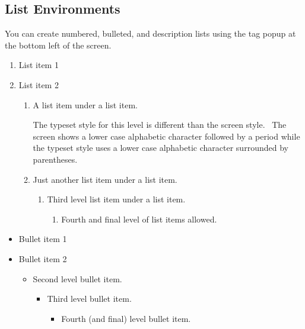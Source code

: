 \documentclass{article}%
\begin{document}
\subsection{List Environments}

You can create numbered, bulleted, and description lists using the tag popup
at the bottom left of the screen.

\begin{enumerate}
\item List item 1

\item List item 2

\begin{enumerate}
\item A list item under a list item.

The typeset style for this level is different than the screen style. \ The
screen shows a lower case alphabetic character followed by a period while the
typeset style uses a lower case alphabetic character surrounded by parentheses.

\item Just another list item under a list item.

\begin{enumerate}
\item Third level list item under a list item.

\begin{enumerate}
\item Fourth and final level of list items allowed.
\end{enumerate}
\end{enumerate}
\end{enumerate}
\end{enumerate}

\begin{itemize}
\item Bullet item 1

\item Bullet item 2

\begin{itemize}
\item Second level bullet item.

\begin{itemize}
\item Third level bullet item.

\begin{itemize}
\item Fourth (and final) level bullet item.
\end{itemize}
\end{itemize}
\end{itemize}
\end{itemize}
\end{document}
